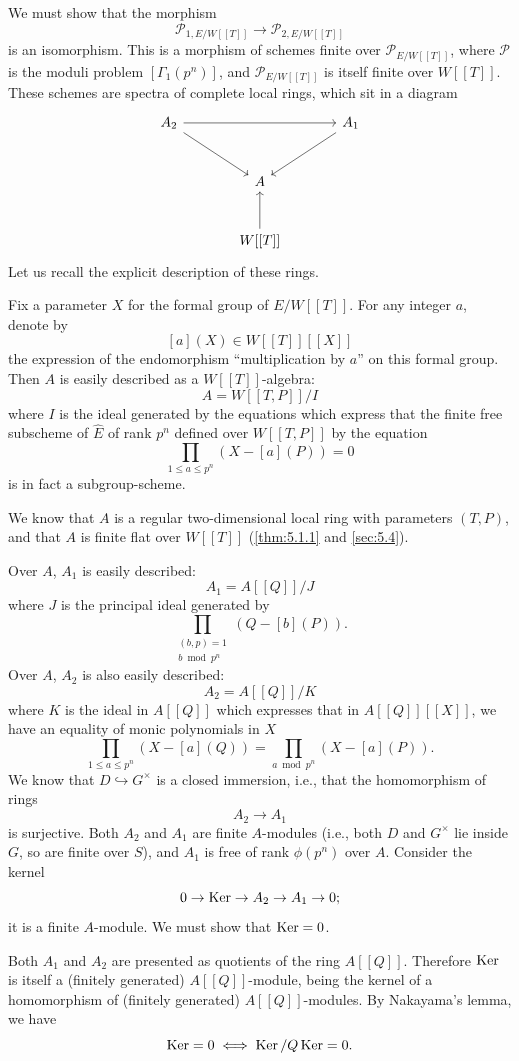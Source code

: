 \begin{pitem}\label{km:6.3.2}
We must show that the morphism
\[
\mathcal{P}_{1,E/W[[T]]} \to \mathcal{P}_{2,E/W[[T]]}
\]
is an isomorphism. This is a morphism of schemes finite over $\mathcal{P}_{E/W[[T]]}$, where $\mathcal{P}$ is the moduli problem $[\Gamma_1(p^n)]$, and $\mathcal{P}_{E/W[[T]]}$ is itself finite over $W[[T]]$. These schemes are spectra of complete local rings, which sit in a diagram
\[
\begin{tikzcd}[row sep=large, column sep=large]
A_2 \arrow[rr] \arrow[dr] & & A_1 \arrow[dl] \\
& A & \\
& W[[T]] \arrow[u]
\end{tikzcd}
\]
Let us recall the explicit description of these rings.

Fix a parameter $X$ for the formal group of $E/W[[T]]$. For any integer $a$, denote by
\[
[a](X) \in W[[T]][[X]]
\]
the expression of the endomorphism ``multiplication by $a$'' on this formal group. Then $A$ is easily described as a $W[[T]]$-algebra:
\[
A = W[[T,P]]/I
\]
where $I$ is the ideal generated by the equations which express that the finite free subscheme of $\hat{E}$ of rank $p^n$ defined over $W[[T,P]]$ by the equation
\[
\prod_{1 \le a \le p^n} (X - [a](P)) = 0
\]
is in fact a subgroup-scheme.

We know that $A$ is a regular two-dimensional local ring with parameters $(T,P)$, and that $A$ is finite flat over $W[[T]]$ (\ref{thm:5.1.1} and \ref{sec:5.4}).

Over $A$, $A_1$ is easily described:
\[
A_1 = A[[Q]]/J
\]
where $J$ is the principal ideal generated by
\[
\prod_{\substack{(b,p)=1 \\ b \bmod p^n}} (Q - [b](P)).
\]
Over $A$, $A_2$ is also easily described:
\[
A_2 = A[[Q]]/K
\]
where $K$ is the ideal in $A[[Q]]$ which expresses that in $A[[Q]][[X]]$, we have an equality of monic polynomials in $X$
\[
\prod_{1 \le a \le p^n} (X - [a](Q)) = \prod_{a \bmod p^n} (X - [a](P)).
\]
We know that $D \hookrightarrow G^\times$ is a closed immersion, i.e., that the homomorphism of rings
\[
A_2 \to A_1
\]
is surjective. Both $A_2$ and $A_1$ are finite $A$-modules (i.e., both $D$ and $G^\times$ lie inside $G$, so are finite over $S$), and $A_1$ is free of rank $\phi(p^n)$ over $A$. Consider the kernel
\[
0 \to \operatorname{Ker} \to A_2 \to A_1 \to 0;
\]
it is a finite $A$-module. We must show that $\operatorname{Ker} = 0$.

Both $A_1$ and $A_2$ are presented as quotients of the ring $A[[Q]]$. Therefore $\operatorname{Ker}$ is itself a (finitely generated) $A[[Q]]$-module, being the kernel of a homomorphism of (finitely generated) $A[[Q]]$-modules. By Nakayama's lemma, we have
\[
\operatorname{Ker} = 0 \iff \operatorname{Ker}/Q\operatorname{Ker} = 0.
\]
\end{pitem}

